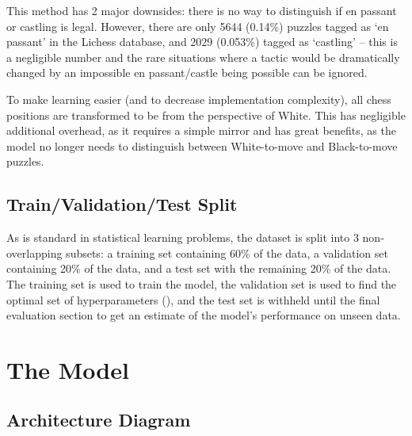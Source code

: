 This method has 2 major downsides: there is no way to distinguish if en passant
or castling is legal. However, there are only 5644 (0.14\%) puzzles tagged as
`en passant' in the Lichess database, and 2029 (0.053\%) tagged as `castling'
-- this is a negligible number and the rare situations where a tactic would be
dramatically changed by an impossible en passant/castle being possible can be
ignored.

To make learning easier (and to decrease implementation complexity), all chess
positions are transformed to be from the perspective of White. This has
negligible additional overhead, as it requires a simple mirror and has great
benefits, as the model no longer needs to distinguish between White-to-move and
Black-to-move puzzles.

\subsection{Train/Validation/Test Split}\label{mlS12}

As is standard in statistical learning problems, the dataset is split into 3
non-overlapping subsets: a training set containing 60\% of the data, a
validation set containing 20\% of the data, and a test set with the remaining
20\% of the data. The training set is used to train the model, the validation
set is used to find the optimal set of hyperparameters (), and the
test set is withheld until the final evaluation section to get an estimate of
the model's performance on unseen data. 


\section{The Model}\label{mlS2}

\subsection{Architecture Diagram}\label{mlS21}

